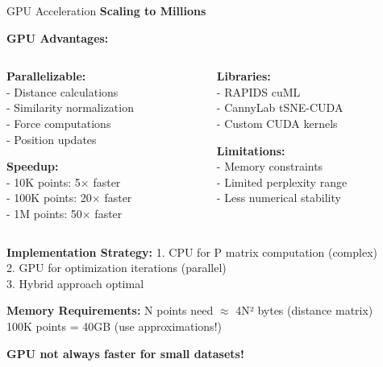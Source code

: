 \documentclass[10pt]{beamer}
\newcommand{\emphtext}[1]{\textcolor{upcblue}{\textbf{#1}}}
\newcommand{\warningbox}[1]{\colorbox{red!10}{\begin{minipage}{0.85\textwidth}\centering #1\end{minipage}}}
\begin{document}
\begin{frame}{GPU Acceleration}
\emphtext{Scaling to Millions}

\vspace{0.3cm}
\textbf{GPU Advantages:}

\begin{columns}[T]
\begin{column}{0.48\textwidth}
\footnotesize
\textbf{Parallelizable:}\\
- Distance calculations\\
- Similarity normalization\\
- Force computations\\
- Position updates

\vspace{0.2cm}
\textbf{Speedup:}\\
- 10K points: 5× faster\\
- 100K points: 20× faster\\
- 1M points: 50× faster
\end{column}

\begin{column}{0.48\textwidth}
\footnotesize
\textbf{Libraries:}\\
- RAPIDS cuML\\
- CannyLab tSNE-CUDA\\
- Custom CUDA kernels

\vspace{0.2cm}
\textbf{Limitations:}\\
- Memory constraints\\
- Limited perplexity range\\
- Less numerical stability
\end{column}
\end{columns}

\vspace{0.3cm}
\textbf{Implementation Strategy:}
\footnotesize
1. CPU for P matrix computation (complex)\\
2. GPU for optimization iterations (parallel)\\
3. Hybrid approach optimal

\vspace{0.2cm}
\textbf{Memory Requirements:}
\footnotesize
N points need $\approx$ 4N² bytes (distance matrix)\\
100K points = 40GB (use approximations!)

\begin{center}
\warningbox{\footnotesize\textbf{GPU not always faster for small datasets!}}
\end{center}
\end{frame}
\end{document}
